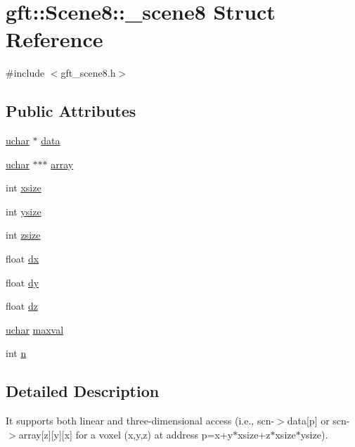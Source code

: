 \hypertarget{structgft_1_1Scene8_1_1__scene8}{}\section{gft\+:\+:Scene8\+:\+:\+\_\+scene8 Struct Reference}
\label{structgft_1_1Scene8_1_1__scene8}


{\ttfamily \#include $<$gft\+\_\+scene8.\+h$>$}

\subsection*{Public Attributes}
\begin{DoxyCompactItemize}
\item 
\hyperlink{namespacegft_a6411e297d5ac5aa9b91a37da00952197}{uchar} $\ast$ \hyperlink{structgft_1_1Scene8_1_1__scene8_aa5d6579e1b372370786e9fcac9aca62c}{data}
\item 
\hyperlink{namespacegft_a6411e297d5ac5aa9b91a37da00952197}{uchar} $\ast$$\ast$$\ast$ \hyperlink{structgft_1_1Scene8_1_1__scene8_abf9e43eda468d5bf3ab460f9d143a7e6}{array}
\item 
int \hyperlink{structgft_1_1Scene8_1_1__scene8_ac686ab156e37bf22332b69cd7cf099c4}{xsize}
\item 
int \hyperlink{structgft_1_1Scene8_1_1__scene8_ae19304fd5aa167a6142b0637312a6da9}{ysize}
\item 
int \hyperlink{structgft_1_1Scene8_1_1__scene8_a356d326df4b0c6d8e9695911f6459973}{zsize}
\item 
float \hyperlink{structgft_1_1Scene8_1_1__scene8_a71585f82d61052a311f77efd4590a5ce}{dx}
\item 
float \hyperlink{structgft_1_1Scene8_1_1__scene8_a964ee1caee6b4a9834323af941355295}{dy}
\item 
float \hyperlink{structgft_1_1Scene8_1_1__scene8_a4d77ad33b9afe9effd883f30e6dae0fb}{dz}
\item 
\hyperlink{namespacegft_a6411e297d5ac5aa9b91a37da00952197}{uchar} \hyperlink{structgft_1_1Scene8_1_1__scene8_a551af784995451a929073da897c4bb27}{maxval}
\item 
int \hyperlink{structgft_1_1Scene8_1_1__scene8_a4a7fd663bf97723061b167fbbcc24554}{n}
\end{DoxyCompactItemize}


\subsection{Detailed Description}
It supports both linear and three-\/dimensional access (i.\+e., scn-\/$>$data\mbox{[}p\mbox{]} or scn-\/$>$array\mbox{[}z\mbox{]}\mbox{[}y\mbox{]}\mbox{[}x\mbox{]} for a voxel (x,y,z) at address p=x+y$\ast$xsize+z$\ast$xsize$\ast$ysize). 


